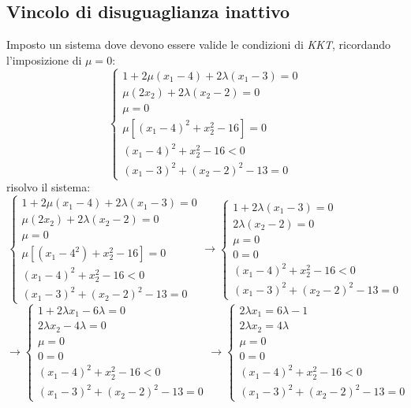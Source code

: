 \documentclass[a4paper,12pt, oneside]{book}
\begin{document}
\subsection{Vincolo di disuguaglianza inattivo}
Imposto un sistema dove devono essere valide le condizioni di
\textit{KKT}, ricordando l'imposizione di $\mu=0$: 
\[
  \begin{cases}
     1+2\mu(x_1-4)+2\lambda(x_1-3)=0\\
     \mu(2x_2)+2\lambda(x_2-2)=0\\
     \mu=0\\
     \mu[(x_1-4)^2+x_2^2-16]=0\\
     (x_1-4)^2+x_2^2-16 < 0\\
     (x_1-3)^2+(x_2-2)^2-13=0
  \end{cases}
\]
risolvo il sistema:
\[
  \begin{cases}
    1+2\mu(x_1-4)+2\lambda(x_1-3)=0\\
    \mu(2x_2)+2\lambda(x_2-2)=0\\
    \mu=0\\
    \mu[(x_1-4^2)+x_2^2-16]=0\\
    (x_1-4)^2+x_2^2-16 < 0\\
    (x_1-3)^2+(x_2-2)^2-13=0
  \end{cases}\to\begin{cases}
    1+2\lambda(x_1-3)=0\\
    2\lambda(x_2-2)=0\\
    \mu=0\\
    0=0\\
    (x_1-4)^2+x_2^2-16 < 0\\
    (x_1-3)^2+(x_2-2)^2-13=0
  \end{cases}
\]
\[
  \to
  \begin{cases}
    1+2\lambda x_1-6\lambda=0\\
    2\lambda x_2-4\lambda=0\\
    \mu=0\\
    0=0\\
    (x_1-4)^2+x_2^2-16 < 0\\
    (x_1-3)^2+(x_2-2)^2-13=0
  \end{cases}\to
  \begin{cases}
    2\lambda x_1=6\lambda-1\\
    2\lambda x_2=4\lambda\\
    \mu=0\\
    0=0\\
    (x_1-4)^2+x_2^2-16 < 0\\
    (x_1-3)^2+(x_2-2)^2-13=0
  \end{cases}
\]
\end{document}
